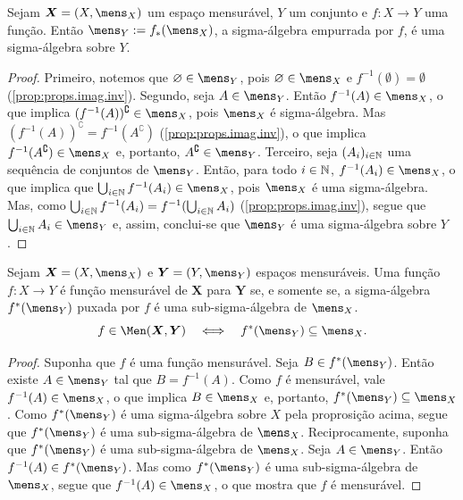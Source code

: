 \begin{prop}
Sejam $\bm X = (X,\mens_X)$ um espaço mensurável, $Y$ um conjunto e $f: X \to Y$ uma função. Então $\mens_Y := f_*(\mens_X)$, a sigma-álgebra empurrada por $f$, é uma sigma-álgebra sobre $Y$.
\end{prop}
\begin{proof}
Primeiro, notemos que $\emptyset \in \mens_Y$, pois $\emptyset \in \mens_X$ e $f^{-1}(\emptyset) = \emptyset$ (\ref{prop:props.imag.inv}). Segundo, seja $A \in \mens_Y$. Então $f^{-1}(A) \in \mens_ X$, o que implica $(f^{-1}(A))^\complement \in \mens_ X$, pois $\mens_ X$ é sigma-álgebra. Mas $(f^{-1}(A))^\complement = f^{-1}(A^\complement)$ (\ref{prop:props.imag.inv}), o que implica $f^{-1}(A^\complement) \in \mens_ X$ e, portanto, $A^\complement \in \mens_ Y$. Terceiro, seja $(A_i)_{i \in \mathbb{N}}$ uma sequência de conjuntos de $\mens_ Y$. Então, para todo $i \in \mathbb{N}$, $f^{-1}(A_i) \in \mens_ X$, o que implica que $\bigcup_{i \in \N} f^{-1}(A_i) \in \mens_ X$, pois $\mens_ X$ é uma sigma-álgebra. Mas, como $\bigcup_{i \in \mathbb{N}} f^{-1}(A_i) = f^{-1}(\bigcup_{i \in \mathbb{N}} A_i)$ (\ref{prop:props.imag.inv}), segue que $\bigcup_{i \in \N} A_i \in \mens_ Y$ e, assim, conclui-se que $\mens_ Y$ é uma sigma-álgebra sobre $Y$.
\end{proof}

\begin{prop}
Sejam $\bm X = (X,\mens_ X)$ e $\bm Y = (Y,\mens_ Y)$ espaços mensuráveis. Uma função $f: X \to Y$ é função mensurável de $\bm X$ para $\bm Y$ se, e somente se, a sigma-álgebra $f^*(\mens_Y)$ puxada por $f$ é uma sub-sigma-álgebra de $\mens_ X$.
	\begin{equation*}
	f \in \Men(\bm X,\bm Y) \sse f^*(\mens_Y) \subseteq \mens_X.
	\end{equation*}
\end{prop}
\begin{proof}
Suponha que $f$ é uma função mensurável. Seja $B \in f^*(\mens_Y)$. Então existe $A \in \mens_ Y$ tal que $B = f^{-1}(A)$. Como $f$ é mensurável, vale $f^{-1}(A) \in \mens_ X$, o que implica $B \in \mens_ X$ e, portanto, $f^*(\mens_Y) \subseteq \mens_ X$. Como $f^*(\mens_Y)$ é uma sigma-álgebra sobre $X$ pela proprosição acima, segue que $f^*(\mens_Y)$ é uma sub-sigma-álgebra de $\mens_ X$. Reciprocamente, suponha que $f^*(\mens_Y)$ é uma sub-sigma-álgebra de $\mens_ X$. Seja $A \in \mens_ Y$. Então $f^{-1}(A) \in f^*(\mens_Y)$. Mas como $f^*(\mens_Y)$ é uma sub-sigma-álgebra de $\mens_ X$, segue que $f^{-1}(A) \in \mens_ X$, o que mostra que $f$ é mensurável.
\end{proof}

